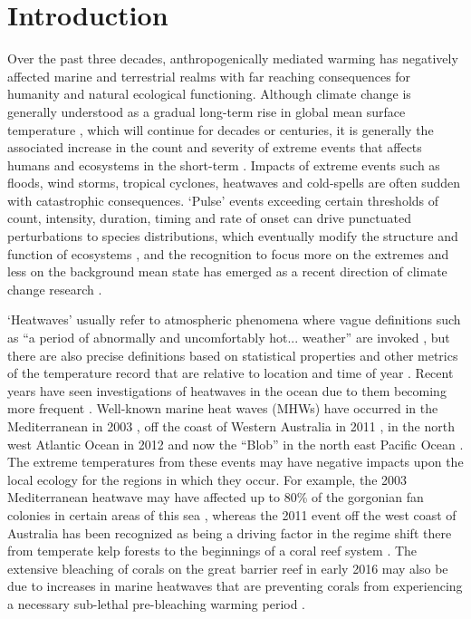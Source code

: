 \documentclass[a4paper,10pt,review]{elsarticle}
\begin{document}
\linenumbers

\section{Introduction}
Over the past three decades, anthropogenically mediated warming has negatively affected marine and terrestrial realms with far reaching consequences for humanity and natural ecological functioning. Although climate change is generally understood as a gradual long-term rise in global mean surface temperature \citep{IPCC2014}, which will continue for decades or centuries, it is generally the associated increase in the count and severity of extreme events that affects humans and ecosystems in the short-term \citep{Easterling2000}. Impacts of extreme events such as floods, wind storms, tropical cyclones, heatwaves and cold-spells are often sudden with catastrophic consequences. `Pulse' events exceeding certain thresholds of count, intensity, duration, timing and rate of onset can drive punctuated perturbations to species distributions, which eventually modify the structure and function of ecosystems \citep{Wernberg2013, Rehage2016}, and the recognition to focus more on the extremes and less on the background mean state has emerged as a recent direction of climate change research \citep{Jentsch2007}.

`Heatwaves' usually refer to atmospheric phenomena where vague definitions such as ``a period of abnormally and uncomfortably hot... weather'' are invoked \citep{Glickman2000}, but there are also precise definitions based on statistical properties and other metrics of the temperature record that are relative to location and time of year \citep[e.g.][]{Meehl2004, Alexander2006, Fischer2010, Fischer2011, Perkins2013}. Recent years have seen investigations of heatwaves in the ocean due to them becoming more frequent \citep[e.g.][]{Mackenzie2007, Selig2010, Sura2011, Lima2012, DeCastro2014}. Well-known marine heat waves (MHWs) have occurred in the Mediterranean in 2003 \citep{Black2004, Olita2007, Garrabou2009}, off the coast of Western Australia in 2011 \citep{Feng2013, Pearce2013, Wernberg2013}, in the north west Atlantic Ocean in 2012 \citep{Mills2012, Chen2014, Chen2015} and now the ``Blob'' in the north east Pacific Ocean \citep{Bond2015}. The extreme temperatures from these events may have negative impacts upon the local ecology for the regions in which they occur. For example, the 2003 Mediterranean heatwave may have affected up to 80\% of the gorgonian fan colonies in certain areas of this sea \citep{Garrabou2009}, whereas the 2011 event off the west coast of Australia has been recognized as being a driving factor in the regime shift there from temperate kelp forests to the beginnings of a coral reef system \citep{Wernberg2013}. The extensive bleaching of corals on the great barrier reef in early 2016 may also be due to increases in marine heatwaves that are preventing corals from experiencing a necessary sub-lethal pre-bleaching warming period \citep{Ainsworth2016}.
\end{document}
